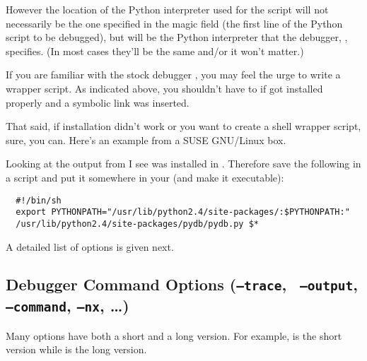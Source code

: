 However the location of the Python interpreter used for the script
will not necessarily be the one specified in the magic field (the
first line of the Python script to be debugged), but will be the
Python interpreter that the debugger, , specifies. (In most
cases they'll be the same and/or it won't matter.)

If you are familiar with the stock debugger , you may feel
the urge to write a wrapper script. As indicated above, you shouldn't
have to if  got installed properly and a symbolic link was
inserted.

That said, if installation didn't work or you want to create a shell
wrapper script, sure, you can. Here's an example from a SUSE GNU/Linux
box.

Looking at the output from  I see  was
installed in . Therefore save
the following in a script and put it somewhere in your 
(and make it executable):

\begin{verbatim}
  #!/bin/sh
  export PYTHONPATH="/usr/lib/python2.4/site-packages/:$PYTHONPATH:"
  /usr/lib/python2.4/site-packages/pydb/pydb.py $*
\end{verbatim}

A detailed list of options is given next. 

\subsection{Debugger Command Options ({\tt --trace}, {\tt
    --output}, {\tt --command}, {\tt --nx}, \ldots)\label{subsection-switches}}

Many options have both a short and a long version. For example,
 is the short version while  is the long
version.

